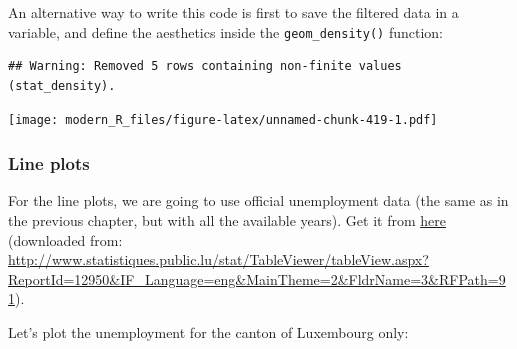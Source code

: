 \documentclass[]{gitbook}
\newenvironment{Shaded}{\begin{snugshade}}{\end{snugshade}}
\newcommand{\DataTypeTok}[1]{\textcolor[rgb]{0.13,0.29,0.53}{#1}}
\newcommand{\DecValTok}[1]{\textcolor[rgb]{0.00,0.00,0.81}{#1}}
\newcommand{\KeywordTok}[1]{\textcolor[rgb]{0.13,0.29,0.53}{\textbf{#1}}}
\newcommand{\NormalTok}[1]{#1}
\newcommand{\OperatorTok}[1]{\textcolor[rgb]{0.81,0.36,0.00}{\textbf{#1}}}
\newcommand{\StringTok}[1]{\textcolor[rgb]{0.31,0.60,0.02}{#1}}
\begin{document}
An alternative way to write this code is first to save the filtered data in a variable, and define
the aesthetics inside the \texttt{geom\_density()} function:

\begin{Shaded}
\end{Shaded}

\begin{verbatim}
## Warning: Removed 5 rows containing non-finite values (stat_density).
\end{verbatim}

\texttt{[image: modern\_R\_files/figure-latex/unnamed-chunk-419-1.pdf]}

\hypertarget{line-plots}{%
\subsubsection{Line plots}\label{line-plots}}

For the line plots, we are going to use official unemployment data (the same as in the previous
chapter, but with all the available years). Get it from
\href{https://github.com/b-rodrigues/modern_R/tree/master/datasets/unemployment/all}{here}
(downloaded from:
\url{http://www.statistiques.public.lu/stat/TableViewer/tableView.aspx?ReportId=12950\&IF_Language=eng\&MainTheme=2\&FldrName=3\&RFPath=91}).

Let's plot the unemployment for the canton of Luxembourg only:

\begin{Shaded}
\end{Shaded}
\end{document}
